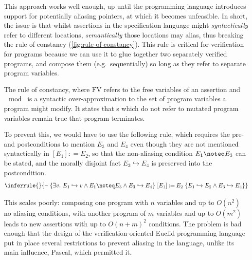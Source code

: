 This approach works well enough, up until the programming language introduces
support for potentially aliasing pointers, at which it becomes
unfeasible. In short, the issue is that
whilst assertions in the specification language might \emph{syntactically}
refer to different locations, \emph{semantically} those locations may alias,
thus breaking the rule of constancy (\cref{fig:rule-of-constancy}). This rule
is critical for  verification for programs because we can use it
to glue together two separately verified programs, and compose them (e.g.\
sequentially) so long as they refer to separate program variables.

\begin{marginfigure}
  \begin{mathpar}
  \end{mathpar}
  \caption{The rule of constancy, where $\mathrm{FV}$ refers to the free
      variables of an assertion and $\mod{}$ is a syntactic
      over-approximation to the set of program variables a program might
      modify. It states that \kl{precondition}s which do not refer to mutated
      program variables remain true that program terminates.}\label{fig:rule-of-constancy}
\end{marginfigure}

To prevent this, we would have to use the following rule, which requires the
pre- and postconditions to mention $E_3$ and $E_4$ even though they are not
mentioned syntactically in $ [ E_1 ] \mathbin{{:}{=}} E_2$, so that the
non-aliasing condition $E_1 \noteq E_3$ can be stated, and the morally disjoint
fact $E_3 \hookrightarrow{} E_4$ is preserved into the postcondition.%
\[
    \inferrule{}{\vdash{}
        \{ \exists{} v.\ E_1 \hookrightarrow{} v \wedge{} E_1 \noteq E_3 \wedge{} E_3 \hookrightarrow{} E_4 \}
        \; [ E_1 ] \mathbin{{:}{=}} E_2 \;
        \{ E_1 \hookrightarrow{} E_2 \wedge{} E_3 \hookrightarrow{} E_4 \} }
\]

This scales poorly: composing one program with $n$ variables and up to $O(n^2)$
no-aliasing conditions, with another program of $m$ variables and up to
$O(m^2)$ leads to new assertions with up to ${O(n + m)}^2$ conditions. The
problem is bad enough that the design of the verification-oriented Euclid
programming language put in place several restrictions to prevent aliasing in
the language, unlike its main influence, Pascal, which permitted
it.~\sidecite{popek1977notes}

